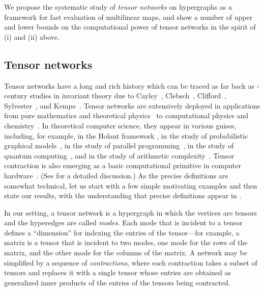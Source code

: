 \documentclass{toc}
\begin{document}
We propose the systematic study of \emph{tensor networks} on hypergraphs as
a framework for fast evaluation of multilinear maps, and show a number of
upper and lower bounds on the computational power of tensor networks
in the spirit of (i) and (ii) above.


\subsection{Tensor networks}

\label{sect:nets}

Tensor networks have a long and rich history which can be traced as
far back as -century studies in invariant theory due
to Cayley~\cite{Cayley1875,Cayley1879}, Clebsch~\cite{Clebsch1861},
Clifford~\cite{Clifford1878}, Sylvester~\cite{Sylvester1878},
and Kempe~\cite{Kempe1885,Kempe1892}.
Tensor networks are extensively deployed in applications from pure mathematics
and theoretical physics~\cite{Kauffman1989,Kuperberg1991,Landsberg2012,LandsbergQY2012,Penrose1956,Penrose1971,RichterGebertL2009,Schrijver2015a} to computational physics and chemistry~\cite{Orus2014,PfeiferHV2014,SolomonikMHSD2014}.
In theoretical computer science,
they appear in various guises,  %
including, for example,
in the Holant framework \cite{Valiant2008,CaiLX2011,CaiGW2016a},
in the study of probabilistic graphical models~\cite{KollerF2009,RobevaS2017},
in the study of parallel programming~\cite{SolomonikH2015},
in the study of quantum computing~\cite{ItaiL2010},
and in the study of arithmetic
complexity~\cite{BeaudryH2007,CapelliDM2016,DammHM2002}.
Tensor contraction is also emerging as a basic
computational primitive in computer
hardware~\cite{JouppiYPPABBBBB17,MarkidisCLPV18}.
(See  for a detailed discussion.)
As the precise definitions are somewhat technical, let us start with
a few simple motivating examples and then state our results,
with the understanding that precise definitions appear
in .

In our setting, a tensor network is a hypergraph in which the vertices are
tensors and the hyperedges are called \emph{modes}.
Each mode that is incident to a tensor defines a ``dimension''
for indexing the entries of the tensor---for example, a matrix is a tensor
that is incident to two modes, one mode for the rows of the matrix, and
the other mode for the columns of the matrix. A network may be simplified
by a sequence of \emph{contractions}, where each contraction takes a subset
of tensors and replaces it with a single tensor whose entries are obtained
as generalized inner products of the entries of the tensors being contracted.
\end{document}
